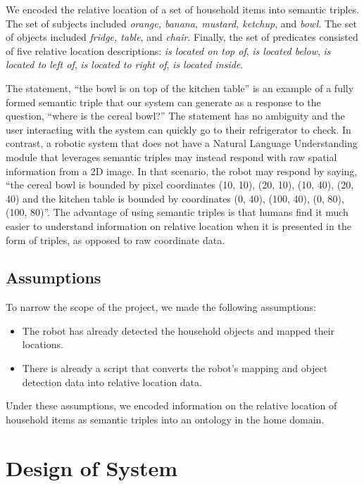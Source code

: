 \documentclass{article}
\begin{document}
We encoded the relative location of a set of household items into semantic 
triples. The set of subjects included \textit{orange, banana, mustard, 
ketchup}, and \textit{bowl}. The set of objects included \textit{fridge,
table}, and \textit{chair}. Finally, the set of predicates consisted 
of five relative location descriptions: \textit{is located on top of}, 
\textit{is located below}, \textit{is located to left of}, 
\textit{is located to right of}, \textit{is located inside}. 

The statement, ``the bowl is on top of the kitchen table'' is an 
example of a fully formed semantic triple that our system can generate as a 
response to the question, ``where is the cereal bowl?'' The statement has no 
ambiguity and the user interacting with the system can quickly go to their 
refrigerator to check. In contrast, a robotic system that does not have a 
Natural Language Understanding module that leverages semantic triples may 
instead respond with raw spatial information from a 2D image. In that
scenario, the robot may respond by saying,
``the cereal bowl is bounded by pixel coordinates (10, 10), (20, 10), 
(10, 40), (20, 40) and the kitchen table is bounded by coordinates (0, 40), 
(100, 40), (0, 80), (100, 80)''. The advantage of using semantic triples is 
that humans find it much easier to understand information on relative 
location when it is presented in the form of triples, as opposed to raw 
coordinate data.

\subsection{Assumptions}
To narrow the scope of the project, we made the following assumptions:
\begin{itemize}
    \item The robot has already detected the household objects and mapped 
        their locations.
    \item There is already a script that converts the robot's mapping and
        object detection data into relative location data.
\end{itemize}
Under these assumptions, we encoded information on the relative location of
household items as semantic triples into an ontology in the home domain.

\section{Design of System}
\end{document}
